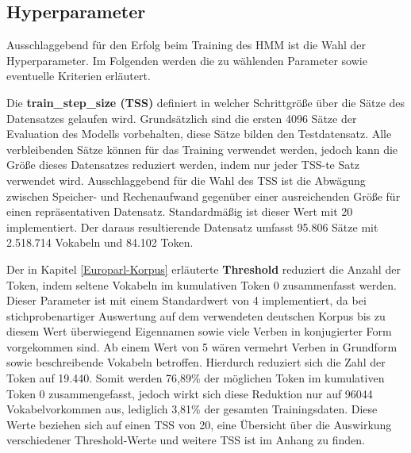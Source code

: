 \documentclass[conference]{IEEEtran}
\begin{document}
\subsection{Hyperparameter}
Ausschlaggebend für den Erfolg beim Training des HMM ist die Wahl der Hyperparameter.
Im Folgenden werden die zu wählenden Parameter sowie eventuelle Kriterien erläutert.

Die \textbf{train\_step\_size (TSS)} definiert in welcher Schrittgröße über die Sätze des Datensatzes gelaufen wird. 
Grundsätzlich sind die ersten 4096 Sätze der Evaluation des Modells vorbehalten, diese Sätze bilden den Testdatensatz. 
Alle verbleibenden Sätze können für das Training verwendet werden, jedoch kann die Größe dieses Datensatzes reduziert werden, indem nur jeder TSS-te Satz verwendet wird. 
Ausschlaggebend für die Wahl des TSS ist die Abwägung zwischen Speicher- und Rechenaufwand gegenüber einer ausreichenden Größe für einen repräsentativen Datensatz. 
Standardmäßig ist dieser Wert mit 20 implementiert.
Der daraus resultierende Datensatz umfasst 95.806 Sätze mit 2.518.714 Vokabeln und 84.102 Token.

Der in Kapitel \ref{Europarl-Korpus} erläuterte \textbf{Threshold} reduziert die Anzahl der Token, indem seltene Vokabeln im kumulativen Token 0 zusammenfasst werden.
Dieser Parameter ist mit einem Standardwert von 4 implementiert, da bei stichprobenartiger Auswertung auf dem verwendeten deutschen Korpus bis zu diesem Wert überwiegend Eigennamen sowie viele Verben in konjugierter Form vorgekommen sind. 
Ab einem Wert von 5 wären vermehrt Verben in Grundform sowie beschreibende Vokabeln betroffen.
Hierdurch reduziert sich die Zahl der Token auf 19.440.
Somit werden 76,89\% der möglichen Token im kumulativen Token 0 zusammengefasst, jedoch wirkt sich diese Reduktion nur auf 96044 Vokabelvorkommen aus, lediglich 3,81\% der gesamten Trainingsdaten. 
Diese Werte beziehen sich auf einen TSS von 20, eine Übersicht über die Auswirkung verschiedener Threshold-Werte und weitere TSS ist im Anhang zu finden.
\end{document}
